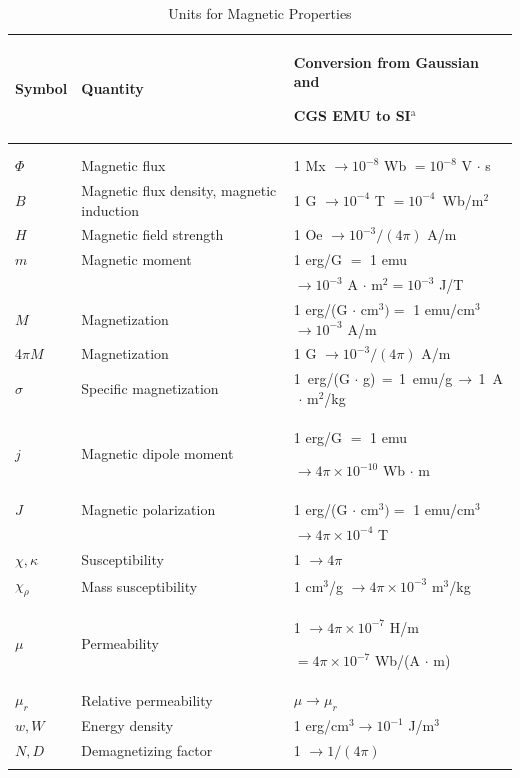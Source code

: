 \documentclass[journal]{IEEEtai}
\begin{document}
\begin{table}
\caption{Units for Magnetic Properties}
\label{table}
\tablefont%
\setlength{\tabcolsep}{3pt}
\begin{tabular*}{21pc}{@{}|p{23pt}|p{81pt}<{\raggedright\hangindent6pt}|p{123pt}<{\raggedright\hangindent6pt}|@{}}
\hline
Symbol& 
Quantity& 
Conversion from Gaussian and \par CGS EMU to SI$^{\mathrm{a}}$ \\
\hline\\[-17pt]
&&\\
$\Phi $& 
Magnetic flux& 
1 Mx $\to  10^{-8}$ Wb $= 10^{-8}$ V$\,\cdot\,$s \\
$B$& 
Magnetic flux density, magnetic induction& 
1 G $\to  10^{-4}$ T $= 10^{-4}$~Wb/m$^{2}$ \\
$H$& 
Magnetic field strength& 
1 Oe $\to  10^{-3}/(4\pi )$ A/m \\
$m$& 
Magnetic moment& 
1 erg/G $=$ 1 emu\\ && $\to 10^{-3}$ A $\cdot$ m$^{2} = 10^{-3}$ J/T \\
$M$& 
Magnetization& 
1 erg/(G $\cdot$ cm$^{3}) =$ 1 emu/cm$^{3}$  $\to 10^{-3}$ A/m \\
4$\pi M$& 
Magnetization& 
1 G $\to  10^{-3}/(4\pi )$ A/m \\
$\sigma $& 
Specific magnetization& 
1~erg/(G$\,{\cdot}\,$g)$\,{=}\,$1~emu/g$\,{\to}\,$1~A$\,{\cdot}\,$m$^{2}$/kg \\
$j$& 
Magnetic dipole  moment& 
1 erg/G $=$ 1 emu\par $\to 4\pi \times  10^{-10}$ Wb $\cdot$ m \\
$J$& 
Magnetic polarization& 
1 erg/(G $\cdot$ cm$^{3}) =$ 1 emu/cm$^{3}$ \\ && $\to 4\pi \times  10^{-4}$ T \\
$\chi , \kappa $& 
Susceptibility& 
1 $\to  4\pi $ \\
$\chi_{\rho }$& 
Mass susceptibility& 
1 cm$^{3}$/g $\to  4\pi \times  10^{-3}$ m$^{3}$/kg \\
$\mu $& 
Permeability& 
1 $\to  4\pi \times  10^{-7}$ H/m\par  $= 4\pi \times  10^{-7}$ Wb/(A $\cdot$ m) \\
$\mu_{r}$& 
Relative permeability& 
$\mu \to \mu_{r}$ \\
$w, W$& 
Energy density& 
1 erg/cm$^{3} \to  10^{-1}$ J/m$^{3}$ \\
$N, D$& 
Demagnetizing factor& 
1 $\to  1/(4\pi )$ \\
\hline
\multicolumn{3}{l}{}\\[-5pt]

\end{tabular*}
\end{table}
\end{document}
